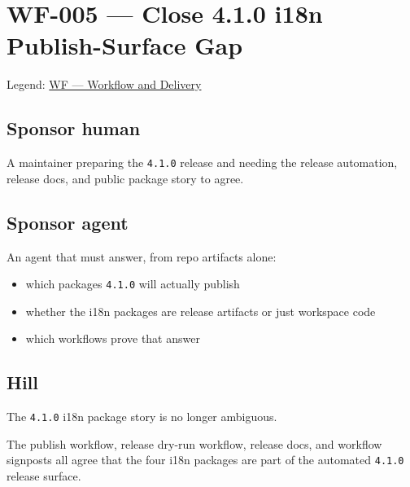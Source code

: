 \chapter{WF-005 --- Close 4.1.0 i18n Publish-Surface Gap}\label{record-203}

\smallskip

Legend: \href{https://github.com/flyingrobots/bijou/blob/1853ad902f6bf219326409e7f743a5a1d6517dbc/docs/legends/WF-workflow-and-delivery.md}{WF --- Workflow and Delivery}

\section{Sponsor human}\label{record-203-sponsor-human}

A maintainer preparing the \texttt{4\allowbreak{}.\allowbreak{}1\allowbreak{}.\allowbreak{}0} release and needing the release automation, release docs, and public package story to agree.

\section{Sponsor agent}\label{record-203-sponsor-agent}

An agent that must answer, from repo artifacts alone:

\begin{itemize}
\tightlist
\item
  which packages \texttt{4\allowbreak{}.\allowbreak{}1\allowbreak{}.\allowbreak{}0} will actually publish
\item
  whether the i18n packages are release artifacts or just workspace code
\item
  which workflows prove that answer
\end{itemize}

\section{Hill}\label{record-203-hill}

The \texttt{4\allowbreak{}.\allowbreak{}1\allowbreak{}.\allowbreak{}0} i18n package story is no longer ambiguous.

The publish workflow, release dry-run workflow, release docs, and workflow signposts all agree that the four i18n packages are part of the automated \texttt{4\allowbreak{}.\allowbreak{}1\allowbreak{}.\allowbreak{}0} release surface.

